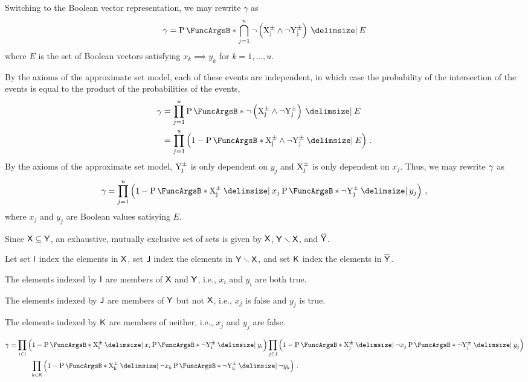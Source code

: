 \documentclass[11pt,final,hidelinks]{article}
\begin{document}
Switching to the Boolean vector representation, we may rewrite $\gamma$ as
\begin{equation}
\tsr = \Prob{\bigcap_{j=1}^{u} \neg \left(\AVecComp{X}[j] \land \neg 
	\AVecComp{Y}[j]\right) \Given E}
\end{equation}
where $E$ is the set of Boolean vectors satisfying $x_k \implies y_k$ for $k=1,\ldots,u$.

By the axioms of the approximate set model, each of these events are independent, in which case the probability of the intersection of the events is equal to the product of the probabilities of the events,
\begin{align}
\tsr
&= \prod_{j=1}^{u} \Prob{\neg\left(\AVecComp{X}[j] 
	\land \neg \AVecComp{Y}[j]\right) \Given E}\\
&= \prod_{j=1}^{u} \left(1 - \Prob{\AVecComp{X}[j] 
	\land \neg \AVecComp{Y}[j] \Given E}\right)\,.
\end{align}
By the axioms of the approximate set model, $\AVecComp{Y}[j]$ is only dependent on $y_j$ and $\AVecComp{X}[j]$ is only dependent on $x_j$.
Thus, we may rewrite 
$\gamma$ as
\begin{equation}
\tsr = \prod_{j=1}^{u}\left(
1 - \Prob{\AVecComp{X}[j] \Given x_j}
\Prob{\neg \AVecComp{Y}[j] \Given y_j}\right)\,,
\end{equation}
where $x_j$ and $y_j$ are Boolean values satisying $E$.

Since $\Set{X} \subseteq \Set{Y}$, an exhaustive, mutually exclusive set of sets is given by $\Set{X}$, $\SetDiff[\Set{Y}][\Set{X}]$, and $\SetComplement[\Set{Y}]$.

Let set $\Set{I}$ index the elements in $\Set{X}$, set $\Set{J}$ index the elements in $\SetDiff[\Set{Y}][\Set{X}]$, and set $\Set{K}$ index the elements in $\SetComplement[\Set{Y}]$.

The elements indexed by $\Set{I}$ are members of $\Set{X}$ and $\Set{Y}$, i.e., $x_i$ and $y_i$ are both true.

The elements indexed by $\Set{J}$ are members of $\Set{Y}$ but not $\Set{X}$, i.e., $x_j$ is false and $y_j$ is true.

The elements indexed by $\Set{K}$ are members of neither, i.e., $x_j$ and $y_j$ are false.

\begin{equation}
\begin{split}
\tsr =
&\prod_{i \in \Set{I}}
\left(1-\Prob{\AVecComp{X}[i] \Given x_i}
\Prob{\neg \AVecComp{Y}[i] \Given y_i}\right)
\prod_{j \in \Set{J}}
\left(1-\Prob{\AVecComp{X}[j] \Given \neg x_j}
\Prob{\neg \AVecComp{Y}[j] \Given y_j}\right)\\
&\qquad \prod_{k \in \Set{K}}
\left(1-\Prob{\AVecComp{X}[k] \Given \neg x_k}
\Prob{\neg \AVecComp{Y}[k] \Given \neg y_k}\right)\,.  
\end{split}    
\end{equation}
\end{document}
